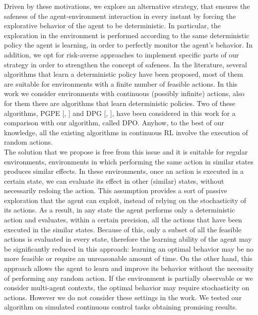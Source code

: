 Driven by these motivations, we explore an alternative strategy, that ensures the safeness of the agent-environment interaction in every instant by forcing the explorative behavior of the agent to be deterministic. In particular, the exploration in the environment is performed according to the same deterministic policy the agent is learning, in order to perfectly monitor the agent's behavior. In addition, we opt for risk-averse approaches to implement specific parts of our strategy in order to strengthen the concept of safeness. In the literature, several algorithms that learn a deterministic policy have been proposed, most of them are suitable for environments with a finite number of feasible actions. In this work we consider environments with continuous (possibly infinite) actions, also for them there are algorithms that learn deterministic policies. Two of these algorithms, \acf{PGPE} [\citet{sehnke2008PolicyGradient}, ] and \acf{DPG} [\citet{article}, ], have been considered in this work for a comparison with our algorithm, called \acf{DPO}. Anyhow, to the best of our knowledge, all the existing algorithms in continuous \ac{RL} involve the execution of random actions.\\
\newline
The solution that we propose is free from this issue and it is suitable for regular environments, \ie environments in which performing the same action in similar states produces similar effects. In these environments, once an action is executed in a certain state, we can evaluate its effect in other (similar) states, without necessarily redoing the action. This assumption provides a sort of passive exploration that the agent can exploit, instead of relying on the stochasticity of its actions. As a result, in any state the agent performs only a deterministic action and evaluates, within a certain precision, all the actions that have been executed in the similar states. Because of this, only a subset of all the feasible actions is evaluated in every state, therefore the learning ability of the agent may be significantly reduced in this approach: learning an optimal behavior may be no more feasible or require an unreasonable amount of time. On the other hand, this approach allows the agent to learn and improve its behavior without the necessity of performing any random action. If the environment is partially observable or we consider multi-agent contexts, the optimal behavior may require stochasticity on actions. However we do not consider these settings in the work. We tested our algorithm on simulated continuous control tasks obtaining promising results.\\
